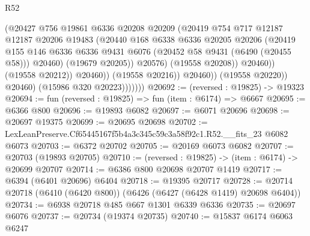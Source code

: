 \begin{lexlean}{R52}
\begin{coremodule}
                                    (@20427
                                      @756
                                      @19861
                                      @6336
                                      @20208
                                      @20209
                                      (@20419
                                        @754
                                        @717
                                        @12187
                                        @12187
                                        @20206
                                        @19483
                                        (@20440
                                          @168
                                          @6338
                                          @6336
                                          @20205
                                          @20206
                                          (@20419
                                            @155
                                            @146
                                            @6336
                                            @6336
                                            @9431
                                            @6076
                                            (@20452 @58 @9431 (@6490 (@20455 @58)))
                                            @20460)
                                          (@19679 @20205))
                                        @20576)
                                      (@19558 @20208))
                                    @20460))
                                (@19558 @20212))
                              @20460))
                          (@19558 @20216))
                        @20460))
                    (@19558 @20220))
                  @20460)
                (@15986 @320 @20223)))))))
@20692 := (reversed : @19825) -> @19323
@20694 := fun (reversed : @19825) => fun (item : @6174) => @6667
@20695 := @6366 @800
@20696 := @19893 @6082
@20697 := @6071 @20696
@20698 := @20697 @19375
@20699 := @20695 @20698
@20702 := LexLeanPreserve.Cf65445167f5b4a3c345c59c3a58f92c1.R52.__fits_23 @6082 @6073
@20703 := @6372 @20702
@20705 := @20169 @6073 @6082
@20707 := @20703 (@19893 @20705)
@20710 := (reversed : @19825) -> (item : @6174) -> @20699 @20707
@20714 := @6386 @800 @20698 @20707 @1419
@20717 := @6394 (@6401 @20696) @6404
@20718 := @19395 @20717
@20728 := @20714 @20718 (@6410 (@6420 @800)) (@6426 (@6427 (@6428 @1419) @20698 @6404))
@20734 := @6938 @20718 @485 @667 @1301 @6339 @6336
@20735 := @20697 @6076
@20737 := @20734 (@19374 @20735)
@20740 := @15837 @6174 @6063 @6247

\end{coremodule}
\end{lexlean}
